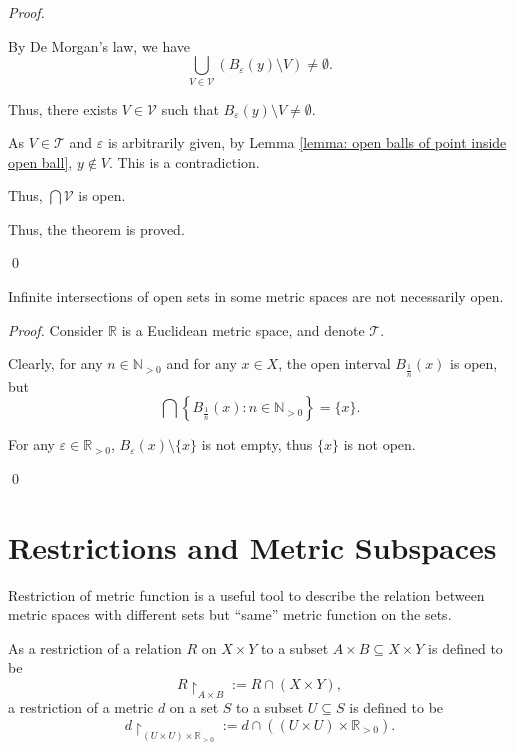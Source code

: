 \begin{theorem}
\begin{proof}
\begin{enumerate}[\bf O1.]
				By De Morgan's law, we have
				$$
				\bigcup_{V \in \mathcal V}(B_\varepsilon (y) \setminus V) \ne \emptyset.
				$$
				
				Thus, there exists $V \in \mathcal V$ such that $B_\varepsilon (y) \setminus V \ne \emptyset$.
				
				As $V \in \mathcal T$ and $\varepsilon$ is arbitrarily given, by Lemma \ref{lemma: open balls of point inside open ball}, $y \notin V$. This is a contradiction.
				
				Thus, $\bigcap \mathcal V$ is open.
				
				\qedlemma
		\end{enumerate}
		
		Thus, the theorem is proved.
		
		\qed
	\end{proof}
\end{theorem}


\begin{theorem}
	Infinite intersections of open sets in some metric spaces are not necessarily open.
	
	\begin{proof}
		Consider $\mathbb R$ is a Euclidean metric space, and denote $\mathcal T$.
		
		Clearly, for any $n \in \mathbb N_{> 0}$ and for any $x \in X$, the open interval $B_{\frac{1}{n}}(x)$ is open, but
		$$
		\bigcap\left\{ B_{\frac{1}{n}}\left( x \right) : n \in \mathbb N_{> 0} \right\} = \{ x \} .
		$$
		
		For any $\varepsilon \in \mathbb R_{> 0}$, $B_\varepsilon(x) \setminus \{x\}$ is not empty, thus $\{x\}$ is not open.
		
		\qed
	\end{proof}
\end{theorem}


\section{Restrictions and Metric Subspaces}


Restriction of metric function is a useful tool to describe the relation between metric spaces with different sets but ``same'' metric function on the sets.

As a restriction of a relation $R$ on $X \times Y$ to a subset $A \times B \subseteq X \times Y$ is defined to be
$$
R \restriction_{A \times B} := R \cap (X \times Y),
$$
a restriction of a metric $d$ on a set $S$ to a subset $U \subseteq S$ is defined to be
$$
d \restriction_{(U \times U) \times \mathbb R_{> 0}} := d \cap ((U \times U) \times \mathbb R_{> 0}).
$$

